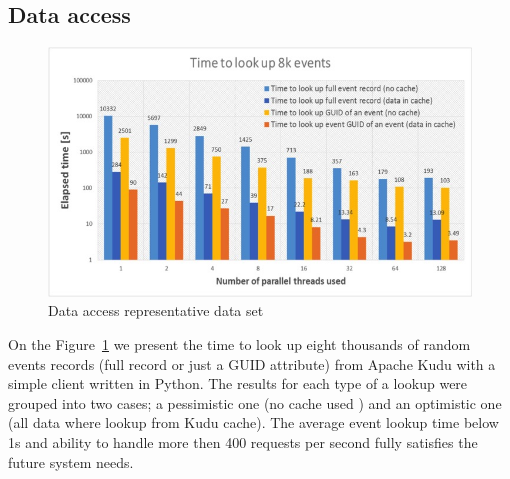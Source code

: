 \documentclass{webofc}
\begin{document}
\subsection{Data access}
\label{sec-6-da}
\begin{figure}
\centering
\includegraphics[width=\linewidth,clip]{data_access.jpg}
\caption{Data access representative data set}
\label{fig:access}
\end{figure}
On the Figure~\ref{fig:access} we present the time to look up eight thousands of random events records (full record or just a GUID attribute) from Apache Kudu with a simple client written in Python.
The results for each type of a lookup were grouped into two cases; a pessimistic one (no cache used ) and an optimistic one (all data where lookup from Kudu cache).
The average event lookup time below 1s and ability to handle more then 400 requests per second fully satisfies the future system needs. 
\end{document}
